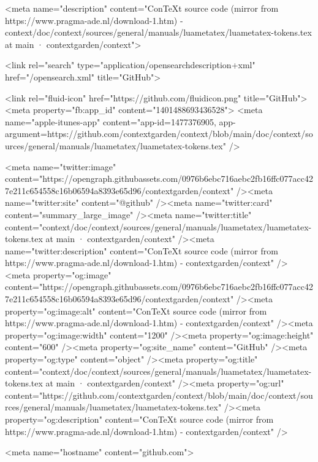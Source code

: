     

      <meta name="description" content="ConTeXt source code (mirror from https://www.pragma-ade.nl/download-1.htm) - context/doc/context/sources/general/manuals/luametatex/luametatex-tokens.tex at main · contextgarden/context">

      <link rel="search" type="application/opensearchdescription+xml" href="/opensearch.xml" title="GitHub">

    <link rel="fluid-icon" href="https://github.com/fluidicon.png" title="GitHub">
    <meta property="fb:app_id" content="1401488693436528">
    <meta name="apple-itunes-app" content="app-id=1477376905, app-argument=https://github.com/contextgarden/context/blob/main/doc/context/sources/general/manuals/luametatex/luametatex-tokens.tex" />

      <meta name="twitter:image" content="https://opengraph.githubassets.com/0976b6ebc716aebc2fb16ffc077acc427e211c654558c16b06594a8393e65d96/contextgarden/context" /><meta name="twitter:site" content="@github" /><meta name="twitter:card" content="summary_large_image" /><meta name="twitter:title" content="context/doc/context/sources/general/manuals/luametatex/luametatex-tokens.tex at main · contextgarden/context" /><meta name="twitter:description" content="ConTeXt source code (mirror from https://www.pragma-ade.nl/download-1.htm) - contextgarden/context" />
  <meta property="og:image" content="https://opengraph.githubassets.com/0976b6ebc716aebc2fb16ffc077acc427e211c654558c16b06594a8393e65d96/contextgarden/context" /><meta property="og:image:alt" content="ConTeXt source code (mirror from https://www.pragma-ade.nl/download-1.htm) - contextgarden/context" /><meta property="og:image:width" content="1200" /><meta property="og:image:height" content="600" /><meta property="og:site_name" content="GitHub" /><meta property="og:type" content="object" /><meta property="og:title" content="context/doc/context/sources/general/manuals/luametatex/luametatex-tokens.tex at main · contextgarden/context" /><meta property="og:url" content="https://github.com/contextgarden/context/blob/main/doc/context/sources/general/manuals/luametatex/luametatex-tokens.tex" /><meta property="og:description" content="ConTeXt source code (mirror from https://www.pragma-ade.nl/download-1.htm) - contextgarden/context" />
  




      <meta name="hostname" content="github.com">



